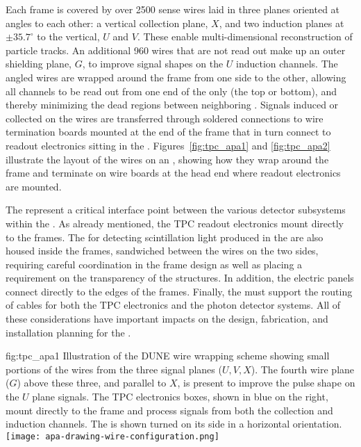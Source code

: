 Each  frame is covered by over \num{2500} sense wires laid in three planes  oriented at angles to each other: a vertical collection plane, $X$, and two induction planes at $\pm35.7^\circ$ to the vertical, $U$ and $V$. These enable multi-dimensional reconstruction of particle tracks.  An additional \num{960} wires that are not read out make up an outer shielding plane, $G$, to improve signal shapes on the $U$ induction channels.  The angled wires are wrapped around the frame from one side to the other, allowing all channels to be read out from one end of the  only (the top or bottom), and thereby minimizing the dead regions between neighboring . Signals induced or collected on the wires are transferred through soldered connections to wire termination boards mounted at the end of the  frame that in turn connect to  readout electronics sitting in the \lar.  Figures~\ref{fig:tpc_apa1} and \ref{fig:tpc_apa2} illustrate the layout of the wires on an , showing how they wrap around the frame and terminate on wire boards at the head end where readout electronics are mounted.

The  represent a critical interface point between the various detector subsystems within the .  As already mentioned, the TPC readout electronics mount directly to the  frames.  The  for detecting scintillation light produced in the \lar are also housed inside the frames, sandwiched between the wires on the two sides, requiring careful coordination in the frame design as well as placing a requirement on the transparency of the  structures.  In addition, the electric  panels connect directly to the edges of the  frames.  Finally, the  must support the routing of cables for both the TPC electronics and the photon detector systems. All of these considerations have important impacts on the design, fabrication, and installation planning for the .   

\begin{dunefigure}{fig:tpc_apa1}
{Illustration of the DUNE  wire wrapping scheme showing small portions of the wires from the three signal planes ($U,V,X$). The fourth wire plane ($G$) above these three, and parallel to $X$, is present to improve the pulse shape on the $U$ plane signals. The TPC electronics boxes, shown in blue on the right, mount directly to the frame and process signals from both the collection and induction channels. The  is shown turned on its side in a horizontal orientation.} 
\texttt{[image: apa-drawing-wire-configuration.png]} 
\end{dunefigure} 

